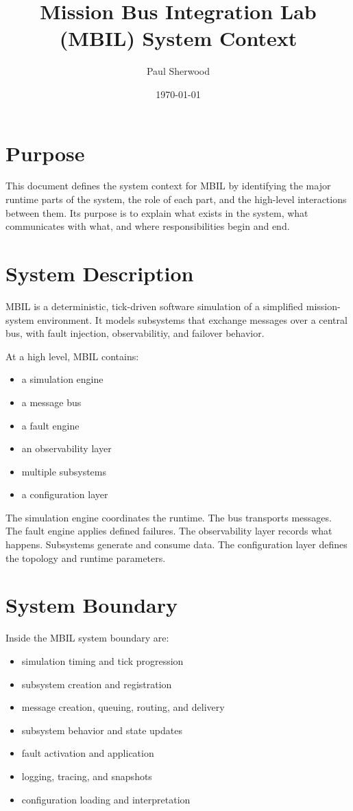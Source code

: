\documentclass[12pt]{article}
\title{Mission Bus Integration Lab (MBIL) System Context}
\author{Paul Sherwood}
\date{\today}
\begin{document}
\maketitle


\section{Purpose}
This document defines the system context for MBIL by identifying the major runtime parts of the system, the role of each part, and the high-level interactions between them.  Its purpose is to explain what exists in the system, what communicates with what, and where responsibilities begin and end.

\section{System Description}
MBIL is a deterministic, tick-driven software simulation of a simplified mission-system environment.  It models subsystems that exchange messages over a central bus, with fault injection, observabilitiy, and failover behavior.

At a high level, MBIL contains:

\begin{itemize}[leftmargin=*]
    \item a simulation engine
    \item a message bus
    \item a fault engine
    \item an observability layer
    \item multiple subsystems
    \item a configuration layer
\end{itemize}

The simulation engine coordinates the runtime.  The bus transports messages.  The fault engine applies defined failures.  The observability layer records what happens.  Subsystems generate and consume data.  The configuration layer defines the topology and runtime parameters.

\section{System Boundary}
Inside the MBIL system boundary are:

\begin{itemize}[leftmargin=*]
    \item simulation timing and tick progression
    \item subsystem creation and registration
    \item message creation, queuing, routing, and delivery
    \item subsystem behavior and state updates
    \item fault activation and application
    \item logging, tracing, and snapshots
    \item configuration loading and interpretation
\end{itemize}
\end{document}
